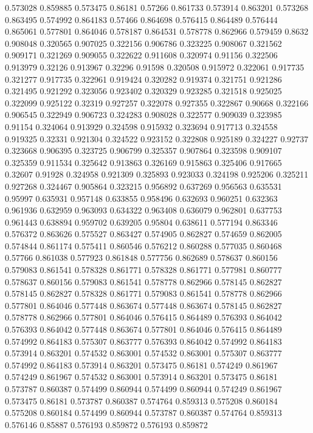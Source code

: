 0.573028 0.859885
0.573475 0.86181
0.57266 0.861733
0.573914 0.863201
0.573268 0.863495
0.574992 0.864183
0.57466 0.864698
0.576415 0.864489
0.576444 0.865061
0.577801 0.864046
0.578187 0.864531
0.578778 0.862966
0.579459 0.8632
0.908048 0.320565
0.907025 0.322156
0.906786 0.323225
0.908067 0.321562
0.909171 0.321269
0.909055 0.322622
0.911608 0.320974
0.91156 0.322506
0.913979 0.32126
0.913967 0.32296
0.91598 0.320508
0.915972 0.322061
0.917735 0.321277
0.917735 0.322961
0.919424 0.320282
0.919374 0.321751
0.921286 0.321495
0.921292 0.323056
0.923402 0.320329
0.923285 0.321518
0.925025 0.322099
0.925122 0.32319
0.927257 0.322078
0.927355 0.322867
0.90668 0.322166
0.906545 0.322949
0.906723 0.324283
0.908028 0.322577
0.909039 0.323985
0.91154 0.324064
0.913929 0.324598
0.915932 0.323694
0.917713 0.324558
0.919325 0.32331
0.921304 0.324522
0.923152 0.322808
0.925189 0.324227
0.92737 0.323668
0.906395 0.323725
0.906799 0.325357
0.907864 0.323598
0.909107 0.325359
0.911534 0.325642
0.913863 0.326169
0.915863 0.325406
0.917665 0.32607
0.91928 0.324958
0.921309 0.325893
0.923033 0.324198
0.925206 0.325211
0.927268 0.324467
0.905864 0.323215
0.956892 0.637269
0.956563 0.635531
0.95997 0.635931
0.957148 0.633855
0.958496 0.632693
0.960251 0.632363
0.961936 0.632959
0.963093 0.634322
0.963408 0.636079
0.962801 0.637753
0.961443 0.638894
0.959702 0.639205
0.95804 0.638611
0.577194 0.863346
0.576372 0.863626
0.575527 0.863427
0.574905 0.862827
0.574659 0.862005
0.574844 0.861174
0.575411 0.860546
0.576212 0.860288
0.577035 0.860468
0.57766 0.861038
0.577923 0.861848
0.577756 0.862689
0.578637 0.860156
0.579083 0.861541
0.578328 0.861771
0.578328 0.861771
0.577981 0.860777
0.578637 0.860156
0.579083 0.861541
0.578778 0.862966
0.578145 0.862827
0.578145 0.862827
0.578328 0.861771
0.579083 0.861541
0.578778 0.862966
0.577801 0.864046
0.577448 0.863674
0.577448 0.863674
0.578145 0.862827
0.578778 0.862966
0.577801 0.864046
0.576415 0.864489
0.576393 0.864042
0.576393 0.864042
0.577448 0.863674
0.577801 0.864046
0.576415 0.864489
0.574992 0.864183
0.575307 0.863777
0.576393 0.864042
0.574992 0.864183
0.573914 0.863201
0.574532 0.863001
0.574532 0.863001
0.575307 0.863777
0.574992 0.864183
0.573914 0.863201
0.573475 0.86181
0.574249 0.861967
0.574249 0.861967
0.574532 0.863001
0.573914 0.863201
0.573475 0.86181
0.573787 0.860387
0.574499 0.860944
0.574499 0.860944
0.574249 0.861967
0.573475 0.86181
0.573787 0.860387
0.574764 0.859313
0.575208 0.860184
0.575208 0.860184
0.574499 0.860944
0.573787 0.860387
0.574764 0.859313
0.576146 0.85887
0.576193 0.859872
0.576193 0.859872
